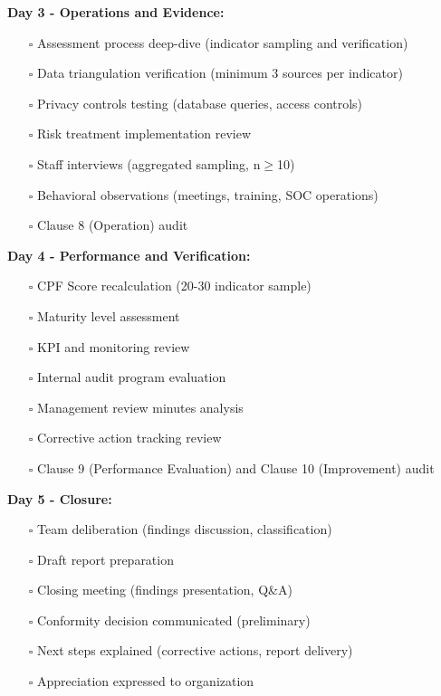 \documentclass[11pt,a4paper]{article}
\begin{document}
\textbf{Day 3 - Operations and Evidence:}

\begin{itemize}
\item[$\square$] Assessment process deep-dive (indicator sampling and verification)
\item[$\square$] Data triangulation verification (minimum 3 sources per indicator)
\item[$\square$] Privacy controls testing (database queries, access controls)
\item[$\square$] Risk treatment implementation review
\item[$\square$] Staff interviews (aggregated sampling, n$\geq$10)
\item[$\square$] Behavioral observations (meetings, training, SOC operations)
\item[$\square$] Clause 8 (Operation) audit
\end{itemize}

\textbf{Day 4 - Performance and Verification:}

\begin{itemize}
\item[$\square$] CPF Score recalculation (20-30 indicator sample)
\item[$\square$] Maturity level assessment
\item[$\square$] KPI and monitoring review
\item[$\square$] Internal audit program evaluation
\item[$\square$] Management review minutes analysis
\item[$\square$] Corrective action tracking review
\item[$\square$] Clause 9 (Performance Evaluation) and Clause 10 (Improvement) audit
\end{itemize}

\textbf{Day 5 - Closure:}

\begin{itemize}
\item[$\square$] Team deliberation (findings discussion, classification)
\item[$\square$] Draft report preparation
\item[$\square$] Closing meeting (findings presentation, Q\&A)
\item[$\square$] Conformity decision communicated (preliminary)
\item[$\square$] Next steps explained (corrective actions, report delivery)
\item[$\square$] Appreciation expressed to organization
\end{itemize}
\end{document}
